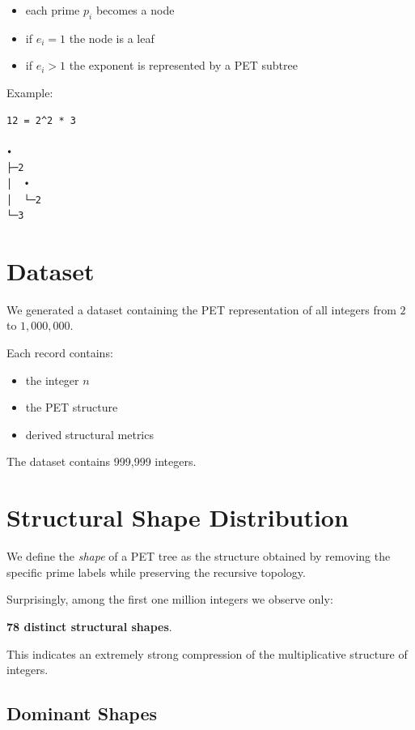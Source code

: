 \documentclass[11pt]{article}
\begin{document}
\begin{itemize}
\item each prime $p_i$ becomes a node
\item if $e_i = 1$ the node is a leaf
\item if $e_i > 1$ the exponent is represented by a PET subtree
\end{itemize}

Example:

\begin{verbatim}
12 = 2^2 * 3

•
├─2
│  •
│  └─2
└─3
\end{verbatim}

\section{Dataset}

We generated a dataset containing the PET representation of all integers
from $2$ to $1{,}000{,}000$.

Each record contains:

\begin{itemize}
\item the integer $n$
\item the PET structure
\item derived structural metrics
\end{itemize}

The dataset contains 999,999 integers.

\section{Structural Shape Distribution}

We define the \emph{shape} of a PET tree as the structure obtained by
removing the specific prime labels while preserving the recursive topology.

Surprisingly, among the first one million integers we observe only:

\begin{center}
\textbf{78 distinct structural shapes}.
\end{center}

This indicates an extremely strong compression of the multiplicative
structure of integers.

\subsection{Dominant Shapes}
\end{document}
